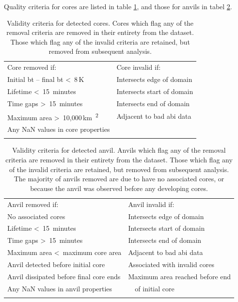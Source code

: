 Quality criteria for cores are listed in table \ref{table:core_validity_criteria}, and those for anvils in tabel \ref{table:anvil_validity_criteria}.

\begin{table}[tb]
\centering
\begin{tabular}{ll}
\tophline
Core removed if:                                                    & Core invalid if: \\
\middlehline
Initial \acrshort{bt} -- final \acrshort{bt} \textless~8\,\unit{K}  & Intersects edge of domain \\
Lifetime \textless~15~minutes                                       & Intersects start of domain \\
Time gaps \textgreater~15~minutes                                   & Intersects end of domain \\
Maximum area \textgreater~10,000\,\unit{km\textsuperscript{2}}      & Adjacent to bad \acrshort{abi} data \\
Any NaN values in core properties                                   & \\
\bottomhline
\end{tabular}
\caption[
Validity criteria for detected cores
]{
Validity criteria for detected cores. Cores which flag any of the removal criteria are removed in their entirety from the dataset. Those which flag any of the invalid criteria are retained, but removed from subsequent analysis.}
\label{table:core_validity_criteria}
\end{table}


\begin{table}[tb]
\centering
\begin{tabular}{ll}
\tophline
Anvil removed if:                               & Anvil invalid if: \\
\middlehline
No associated cores                             & Intersects edge of domain \\
Lifetime \textless~15~minutes                   & Intersects start of domain \\             
Time gaps \textgreater~15~minutes               & Intersects end of domain \\
Maximum area \textless~maximum core area        & Adjacent to bad \acrshort{abi} data \\
Anvil detected before initial core              & Associated with invalid cores \\
Anvil dissipated before final core ends         & Maximum area reached before end \\
Any NaN values in anvil properties              & ~~of initial core \\
\bottomhline
\end{tabular}
\caption[
Validity criteria for detected anvils
]{
Validity criteria for detected anvil. Anvils which flag any of the removal criteria are removed in their entirety from the dataset. Those which flag any of the invalid criteria are retained, but removed from subsequent analysis. The majority of anvils removed are due to have no associated cores, or because the anvil was observed before any developing cores.}
\label{table:anvil_validity_criteria}
\end{table}


